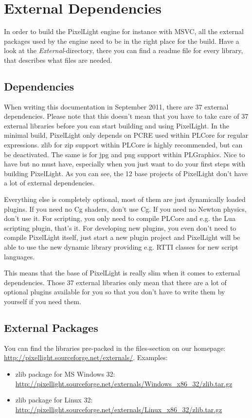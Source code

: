 \chapter{External Dependencies}
\label{Chapter:ExternalDependencies}
In order to build the PixelLight engine for instance with \ac{MSVC}, all the external packages used by the engine need to be in the right place for the build. Have a look at the \emph{External}-directory, there you can find a readme file for every library, that describes what files are needed.




\section{Dependencies}
When writing this documentation in September 2011, there are 37 external dependencies. Please note that this doesn't mean that you have to take care of 37 external libraries before you can start building and using PixelLight. In the minimal build, PixelLight only depends on PCRE used within PLCore for regular expressions. zlib for zip support within PLCore is highly recommended, but can be deactivated. The same is for jpg and png support within PLGraphics. Nice to have but no must have, especially when you just want to do your first steps with building PixelLight. As you can see, the 12 base projects of PixelLight don't have a lot of external dependencies.

Everything else is completely optional, most of them are just dynamically loaded plugins. If you need no Cg shaders, don't use Cg. If you need no Newton physics, don't use it. For scripting, you only need to compile PLCore and e.g. the Lua scripting plugin, that's it. For developing new plugins, you even don't need to compile PixelLight itself, just start a new plugin project and PixelLight will be able to use the new dynamic library providing e.g. \ac{RTTI} classes for new script languages.

This means that the base of PixelLight is really slim when it comes to external dependencies. Those 37 external libraries only mean that there are a lot of optional plugins available for you so that you don't have to write them by yourself if you need them.




\section{External Packages}
You can find the libraries pre-packed in the files-section on our homepage: \url{http://pixellight.sourceforge.net/externals/}. Examples:
\begin{itemize}
\item{zlib package for \ac{MS} Windows \SI{32}{\bit}: \url{http://pixellight.sourceforge.net/externals/Windows_x86_32/zlib.tar.gz}}
\item{zlib package for Linux \SI{32}{\bit}: \url{http://pixellight.sourceforge.net/externals/Linux_x86_32/zlib.tar.gz}}
\end{itemize}


